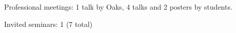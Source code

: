 \begin{tightItemize}
    \item Professional meetings: 1 talk by Oaks, 4 talks and 2 posters by students.
    \item Invited seminars: 1 (7 total)
\end{tightItemize}
